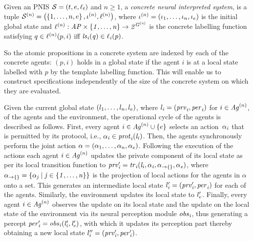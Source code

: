 \begin{definition}
  \label{def:concreteystem}
Given an PNIS $\mathcal S = \left ( {t}, {e}, \ell_t \right )$ and $n \geq 1$, a
\emph{concrete neural interpreted system}, is a tuple $\mathcal{S}^{(n)} = \left (  \left \{ {1},
\ldots, {n}, {e} \right \}, \iota^{({n})}, \ell^{(n)} \right )$, where $\iota^{({n})} =
\left ( \iota_{1}, \ldots, \iota_{n}, \iota_{e} \right )$ is the initial global state and
$\ell^{(n)} :  \it{AP} \times \left \{ 1, \ldots, n  \right \} \rightarrow 2^{G^{(n)}}$ is the concrete labelling function satisfying $q \in \ell^{(n)}(p,i)$ iff
$\it{ls}_{i}(q) \in \ell_{i}(p)$.
\end{definition}


So the atomic propositions in a concrete system are indexed by each of the
concrete agents: $(p, i)$ holds in a global state if the agent $i$ is at a local
state labelled with $p$ by the template labelling function. This will enable us
to construct specifications independently of the size of the concrete system on
which they are evaluated.


Given the current global state $\left ( l_{1}, \ldots, l_{n}, l_{e} \right )$, where $l_{i} = \left ( \it{prv}_{i}, \it{per}_{i} \right )$ for $i \in \mathit{Ag}^{(n)}$, of the
agents and the environment, the operational cycle of the agents is described as
follows. First, every agent ${i} \in \mathit{Ag}^{(n)} \cup \left \{ {e} \right \}$ selects an
action~$\it{\alpha}_{i}$ that is permitted by its protocol, i.e., $\it{\alpha}_{i} \in \it{prot}_{i}
(l_{i})$. Then, the agents synchronously perform the joint action $\alpha =
\left ( \alpha_1,\ldots,\alpha_n,\alpha_e \right )$.  Following  the execution of the
actions each agent ${i} \in \mathit{Ag}^{(n)}$ updates the private component of its
local state as per its local transition function to $\it{prv}'_{i} = \it{tr}_{i}(
l_{i}, \it{\alpha}_{i}, \alpha_{\rightarrow\{\}}, \it{\alpha}_{e})$, where
$\alpha_{\rightarrow\{\}} = \left \{  \it{\alpha}_{j} \mid j \in \left \{ 1, \ldots, n \right \} \right \}$ is the
projection of local actions for the agents in $\alpha$ onto a set.  This
generates an intermediate local state $l'_{i} = \left ( \it{prv}'_{i}, \it{per}_{i} \right )$
for each of the agents. Similarly, the environment updates its local state to
$l'_{e}$. Finally, every agent ${i} \in \mathit{Ag}^{(n)}$ observes the update on
its local state and the update on the local state of the environment via its
neural perception module $\it{obs}_{i}$, thus generating a percept $\it{per}'_{i} = \it{obs}_{i}(l'_{i}, l'_{e})$, with which it updates its perception part thereby
obtaining a new local state $l''_{i} = \left (  \it{prv}'_{i}, \it{per}'_{i} \right )$.


